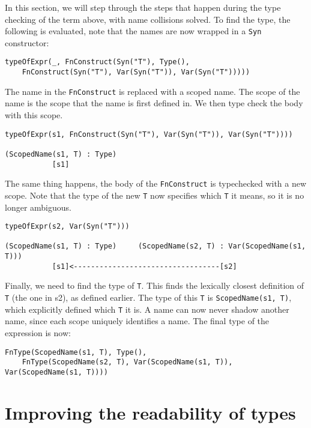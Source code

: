In this section, we will step through the steps that happen during the type checking of the term above, with name collisions solved. To find the type, the following is evaluated, note that the names are now wrapped in a \verb|Syn| constructor:

\begin{lstlisting}
typeOfExpr(_, FnConstruct(Syn("T"), Type(),
	FnConstruct(Syn("T"), Var(Syn("T")), Var(Syn("T")))))
\end{lstlisting}

\noindent
The name in the \verb|FnConstruct| is replaced with a scoped name. The scope of the name is the scope that the name is first defined in. We then type check the body with this scope.

\begin{lstlisting}
typeOfExpr(s1, FnConstruct(Syn("T"), Var(Syn("T")), Var(Syn("T"))))

(ScopedName(s1, T) : Type)
	       [s1]
\end{lstlisting}

\noindent
The same thing happens, the body of the \verb|FnConstruct| is typechecked with a new scope. Note that the type of the new \verb|T| now specifies which \verb|T| it means, so it is no longer ambiguous.

\begin{lstlisting}
typeOfExpr(s2, Var(Syn("T")))

(ScopedName(s1, T) : Type)     (ScopedName(s2, T) : Var(ScopedName(s1, T)))
	       [s1]<----------------------------------[s2]
\end{lstlisting}

Finally, we need to find the type of \verb|T|. This finds the lexically closest definition of \verb|T| (the one in s2), as defined earlier. The type of this \verb|T| is \verb|ScopedName(s1, T)|, which explicitly defined which \verb|T| it is. A name can now never shadow another name, since each scope uniquely identifies a name. The final type of the expression is now:

\begin{lstlisting}
FnType(ScopedName(s1, T), Type(),
	FnType(ScopedName(s2, T), Var(ScopedName(s1, T)), Var(ScopedName(s1, T))))
\end{lstlisting}

\section{Improving the readability of types}

